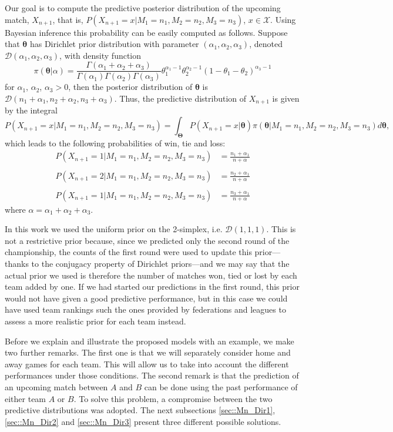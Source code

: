 \documentclass[journal,article,accept,moreauthors,pdftex,12pt,a4paper]{mdpi}
\begin{document}
	Our goal is to compute the predictive posterior distribution of the
	upcoming match, $X_{n+1}$, that is,
	$P(X_{n+1}=x|M_1=n_1,M_2=n_2,M_3=n_3)$, $x\in\mathcal{X}$. Using
	Bayesian inference this probability can be easily computed as
	follows. Suppose that $\boldsymbol{\theta}$ has Dirichlet prior distribution
	with parameter $(\alpha_1,\alpha_2,\alpha_3)$, denoted
	$\mathcal{D}(\alpha_1,\alpha_2,\alpha_3)$, with density function
	\[
	\pi(\boldsymbol{\theta}|\alpha)=\frac{\Gamma(\alpha_1+\alpha_2+\alpha_3)}{\Gamma(\alpha_1)\Gamma(\alpha_2)\Gamma(\alpha_3)}\theta_1^{\alpha_1-1}\theta_2^{\alpha_2-1}(1-\theta_1-\theta_2)^{\alpha_3-1}
	\]
	\noindent for $\alpha_1$, $\alpha_2$, $\alpha_3 > 0$, then the
	posterior distribution of $\boldsymbol{\theta}$ is
	$\mathcal{D}(n_1+\alpha_1,n_2+\alpha_2,n_3+\alpha_3)$. Thus, the
	predictive distribution of $X_{n + 1}$ is given by the
	integral
	$$
	P(X_{n + 1} = x | M_1 = n_1, M_2 = n_2, M_3 = n_3) = \int_{\boldsymbol{\Theta}} P(X_{n
		+ 1} = x | \boldsymbol{\theta}) \pi(\boldsymbol{\theta} | M_1 = n_1, M_2 = n_2, M_3
	= n_3) d\boldsymbol{\theta},
	$$
	which leads to the following probabilities of win, tie and loss:
	\begin{align*}
	P(X_{n+1} = 1 | M_1=n_1,M_2=n_2,M_3=n_3) &=
	\frac{n_1+\alpha_1}{n+\alpha}\\
	& \\
	P(X_{n+1} = 2 | M_1=n_1,M_2=n_2,M_3=n_3) &=
	\frac{n_2+\alpha_1}{n+\alpha} \\
	& \\
	P(X_{n+1} = 1 | M_1=n_1, M_2=n_2, M_3=n_3) &=
	\frac{n_3+\alpha_1}{n+\alpha}
	\end{align*}
	\noindent where $\alpha=\alpha_1+\alpha_2+\alpha_3$.
	
	In this work we used the uniform prior on the 2-simplex, i.e. $\mathcal{D}(1,1,1)$. 
	This is not a restrictive prior because, since we predicted only the second round of the championship, the counts of the first round were used to update this prior---thanks to the conjugacy property of Dirichlet priors---and we may say that the actual prior we used is therefore the number of matches won, tied or lost by each team added by one.
	If we had started our predictions in the first round, this prior would not have given 
	a good predictive performance, but in this case we could have used team rankings such the ones provided by federations and leagues to assess a more realistic prior for each team instead.
	
	Before we explain and illustrate the proposed models with an example, we make two further remarks.
	The first one is that we will separately consider home and away games for each team. This will allow us to take into account the different performances under those conditions.
	The second remark is that the prediction of an upcoming match between $A$ and $B$ can be done using
	the past performance of either team $A$ or $B$.
	To solve this problem, a compromise between the two predictive distributions was adopted. 
	The next subsections \ref{sec::Mn_Dir1}, \ref{sec::Mn_Dir2} and \ref{sec::Mn_Dir3} present three different possible solutions.
	
\end{document}
